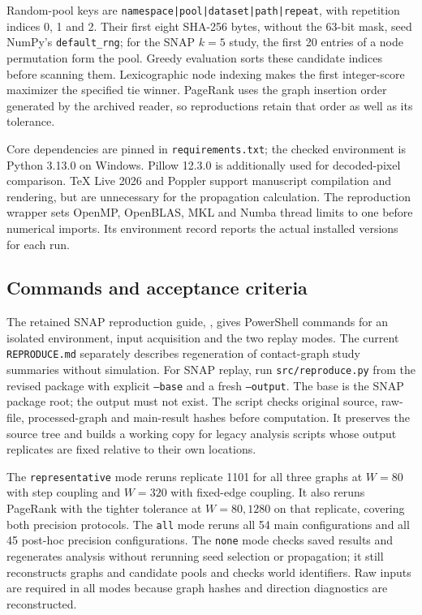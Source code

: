 \documentclass[smallextended]{svjour3}
\begin{document}
Random-pool keys are \texttt{namespace|pool|dataset|path|repeat}, with repetition
indices 0, 1 and 2. Their first eight SHA-256 bytes, without the 63-bit mask,
seed NumPy's \texttt{default\_rng}; for the SNAP $k=5$ study, the first 20 entries of a node permutation
form the pool. Greedy evaluation sorts these candidate indices before scanning
them. Lexicographic node indexing makes the first integer-score maximizer the
specified tie winner. PageRank uses the graph insertion order generated by
the archived reader, so reproductions retain that order as well as its tolerance.

Core dependencies are pinned in \texttt{requirements.txt}; the checked environment
is Python 3.13.0 on Windows. Pillow 12.3.0 is additionally used for decoded-pixel
comparison. TeX Live 2026 and Poppler support manuscript compilation and rendering,
but are unnecessary for the propagation calculation. The reproduction wrapper
sets OpenMP, OpenBLAS, MKL and Numba thread limits to one before numerical imports.
Its environment record reports the actual installed versions for each run.

\subsection{Commands and acceptance criteria}
The retained SNAP reproduction guide, ,
gives PowerShell commands for an isolated environment, input acquisition and
the two replay modes. The current \texttt{REPRODUCE.md} separately describes
regeneration of contact-graph study summaries without simulation. For SNAP replay, run
\texttt{src/reproduce.py} from the revised package with explicit
\texttt{--base} and a fresh \texttt{--output}. The base is the SNAP package
root; the output must not exist. The script checks original source, raw-file,
processed-graph and main-result hashes before computation. It preserves the
source tree and builds a working copy for legacy analysis scripts whose output
replicates are fixed relative to their own locations.

The \texttt{representative} mode reruns replicate 1101 for all three graphs at
$W=80$ with step coupling and $W=320$ with fixed-edge coupling. It also reruns
PageRank with the tighter tolerance at $W=80,1280$ on that replicate, covering both precision protocols.
The \texttt{all} mode reruns all 54 main configurations and all 45 post-hoc
precision configurations. The \texttt{none} mode checks saved results and regenerates
analysis without rerunning seed selection or propagation; it still reconstructs
graphs and candidate pools and checks world identifiers. Raw inputs are required in all modes
because graph hashes and direction diagnostics are reconstructed.
\end{document}
